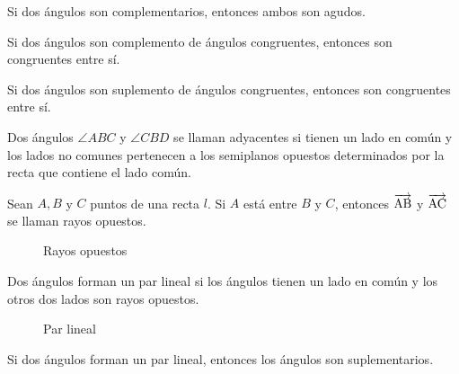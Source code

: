 \begin{theorem}
    Si dos ángulos son complementarios, entonces ambos son agudos.
\end{theorem}

\begin{theorem}
    Si dos ángulos son complemento de ángulos congruentes, entonces son congruentes entre sí.
\end{theorem}

\begin{theorem}
    Si dos ángulos son suplemento de ángulos congruentes, entonces son congruentes entre sí.
\end{theorem}

\begin{definition}
    Dos ángulos $\angle{ABC}$ y $\angle{CBD}$ se llaman adyacentes si tienen un lado en común y los lados no comunes pertenecen a los semiplanos opuestos determinados por la recta que contiene el lado común.
\end{definition}

\begin{definition}
    Sean $A,B$ y $C$ puntos de una recta $l$. Si $A$ está entre $B$ y $C$, entonces $\overrightarrow{\rm AB}$ y $\overrightarrow{\rm AC}$ se llaman rayos opuestos.

    \begin{figure}[!h]
        \centering
        
        \caption{Rayos opuestos}
        \label{fig:oposing-rays}
    \end{figure}
    
\end{definition}

\clearpage

\begin{definition}
    Dos ángulos forman un par lineal si los ángulos tienen un lado en común y los otros dos lados son rayos opuestos.

    \begin{figure}[!h]
        \centering
        
        \caption{Par lineal}
        \label{fig:linear-pair}
    \end{figure}    
    
\end{definition}

\begin{postulate}
    Si dos ángulos forman un par lineal, entonces los ángulos son suplementarios.
\end{postulate}

